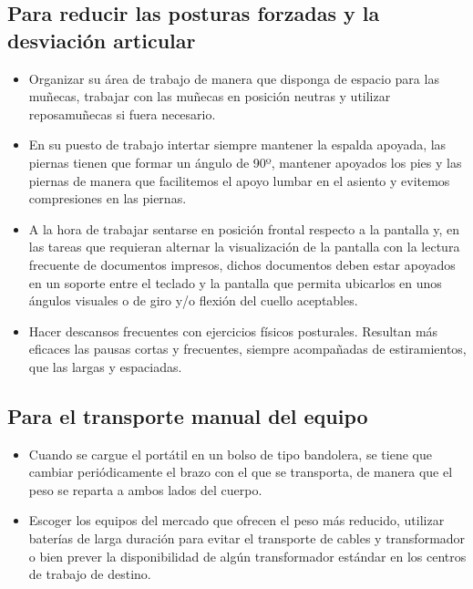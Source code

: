 \documentclass{article}
\begin{document}
      \subsection{Para reducir las posturas forzadas y la desviación articular}
        \begin{itemize}
          \item Organizar su área de trabajo de manera que disponga de espacio para las muñecas, trabajar con las muñecas en posición neutras y utilizar reposamuñecas si fuera 
          necesario.
          \item En su puesto de trabajo intertar siempre mantener la espalda apoyada, las piernas tienen que formar un ángulo de 90º, mantener apoyados los pies y las piernas de manera que facilitemos el apoyo lumbar 
          en el asiento y evitemos compresiones en las piernas.
          \item A la hora de trabajar sentarse en posición frontal respecto a la pantalla y, en las tareas que requieran alternar la visualización de la pantalla con la lectura frecuente de documentos 
          impresos, dichos documentos deben estar apoyados en un soporte entre el teclado y la pantalla que permita ubicarlos en unos ángulos visuales o de giro y/o flexión del 
          cuello aceptables.
          \item Hacer descansos frecuentes con ejercicios físicos posturales. Resultan más eficaces las pausas cortas y frecuentes, siempre acompañadas de estiramientos, que las 
          largas y espaciadas.
        \end{itemize}

      \subsection{Para el transporte manual del equipo}
        \begin{itemize}
          \item Cuando se cargue el portátil en un bolso de tipo bandolera, se tiene que cambiar periódicamente el brazo con el que se transporta, de manera que el peso se reparta a ambos lados del cuerpo.
          \item  Escoger los equipos del mercado que ofrecen el peso más reducido, utilizar baterías de larga duración para evitar el transporte de cables y transformador o bien prever la disponibilidad de algún 
          transformador estándar en los centros de trabajo de destino.
        \end{itemize}
\end{document}
